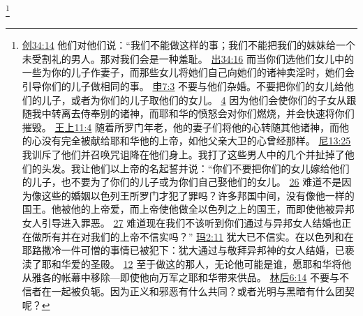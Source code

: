 \documentclass[12pt, a4paper, oneside]{ctexart}
\begin{document}
	\footnote {
		\href{https://biblehub.com/genesis/34-14.htm}{创34:14} 他们对他们说：“我们不能做这样的事；我们不能把我们的妹妹给一个未受割礼的男人。那对我们会是一种羞耻。
		\href{https://biblehub.com/exodus/34-16.htm}{出34:16} 而当你们选他们女儿中的一些为你的儿子作妻子，而那些女儿将她们自己向她们的诸神卖淫时，她们会引导你们的儿子做相同的事。
		\href{https://biblehub.com/deuteronomy/7-3.htm}{申7:3} 不要与他们杂婚。不要把你们的女儿给他们的儿子，或者为你们的儿子取他们的女儿。
		\href{https://biblehub.com/deuteronomy/7-4.htm}{4} 因为他们会使你们的子女从跟随我中转离去侍奉别的诸神，而耶和华的愤怒会对你们燃烧，并会快速将你们摧毁。
		\href{https://biblehub.com/1_kings/11-4.htm}{王上11:4} 随着所罗门年老，他的妻子们将他的心转随其他诸神，而他的心没有完全被献给耶和华他的上帝，如他父亲大卫的心曾经那样。
		\href{https://biblehub.com/nehemiah/13-25.htm}{尼13:25} 我训斥了他们并召唤咒诅降在他们身上。我打了这些男人中的几个并扯掉了他们的头发。我让他们以上帝的名起誓并说：“你们不要把你们的女儿嫁给他们的儿子，也不要为了你们的儿子或为你们自己娶他们的女儿。
		\href{https://biblehub.com/nehemiah/13-26.htm}{26} 难道不是因为像这些的婚姻以色列王所罗门才犯了罪吗？许多邦国中间，没有像他一样的国王。他被他的上帝爱，而上帝使他做全以色列之上的国王，而即使他被异邦女人引导进入罪恶。
		\href{https://biblehub.com/nehemiah/13-27.htm}{27} 难道现在我们不该听到你们通过与异邦女人结婚也正在做所有并在对我们的上帝不信实吗？”
		\href{https://biblehub.com/malachi/2-11.htm}{玛2:11} 犹大已不信实。在以色列和在耶路撒冷一件可憎的事情已被犯下：犹大通过与敬拜异邦神的女人结婚，已亵渎了耶和华爱的圣殿。
		\href{https://biblehub.com/malachi/2-12.htm}{12} 至于做这的那人，无论他可能是谁，愿耶和华将他从雅各的帐幕中移除---即使他向万军之耶和华带来供品。
		\href{https://biblehub.com/2_corinthians/6-14.htm}{林后6:14} 不要与不信者在一起被负轭。因为正义和邪恶有什么共同？或者光明与黑暗有什么团契呢？
	}
\end{document}
